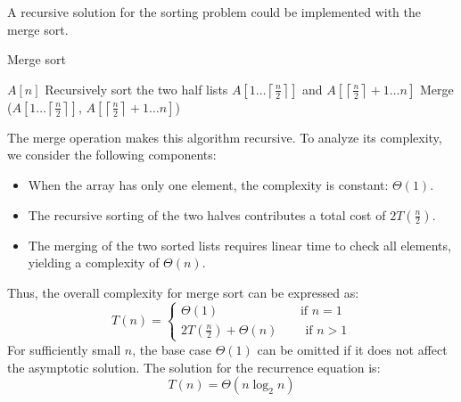A recursive solution for the sorting problem could be implemented with the merge sort.
\begin{algorithm}[H]
    \caption{Merge sort}
        \begin{algorithmic}[1]
                \State\Return $A[n]$
            \EndIf
            \State Recursively sort the two half lists $A\left[1\ldots\left\lceil \frac{n}{2}\right\rceil \right]$ and $A\left[\left\lceil \frac{n}{2}\right\rceil + 1 \ldots n\right]$
            \State Merge ($A\left[1\ldots\left\lceil \frac{n}{2}\right\rceil \right]$, $A\left[\left\lceil \frac{n}{2}\right\rceil + 1 \ldots n\right]$)
        \end{algorithmic}
\end{algorithm}
The merge operation makes this algorithm recursive.
To analyze its complexity, we consider the following components:
\begin{itemize}
    \item When the array has only one element, the complexity is constant: $\Theta(1)$. 
    \item The recursive sorting of the two halves contributes a total cost of $2T\left(\frac{n}{2}\right)$. 
    \item The merging of the two sorted lists requires linear time to check all elements, yielding a complexity of $\Theta(n)$. 
\end{itemize}
Thus, the overall complexity for merge sort can be expressed as:
\[T(n)=\begin{cases} \Theta(1)\qquad\qquad\qquad\: \text{ if }n=1 \\ 2T\left(\frac{n}{2}\right) + \Theta(n)\qquad\:\text{if }n>1 \end{cases}\]
For sufficiently small $n$, the base case $\Theta(1)$ can be omitted if it does not affect the asymptotic solution.
The solution for the recurrence equation is: 
\[T(n)=\Theta(n\log_2 n)\]